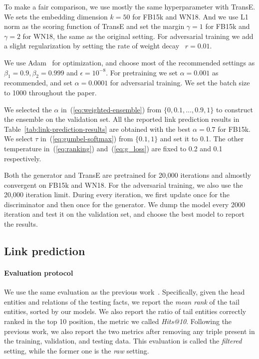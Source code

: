 \documentclass[twocolumn,a4paper,preprint,10pt,3p]{elsarticle}
\begin{document}
To make a fair comparison, we use mostly the same hyperparameter with TransE. We sets the embedding dimension $k=50$ for FB15k and WN18. And we use L1 norm as the scoring function of TransE and set the margin $\gamma=1$ for FB15k and $\gamma=2$ for WN18, the same as the original setting.
For adversarial training we add a slight regularization by setting the rate of weight decay~\cite{weight_decay} $r=0.01$.

We use Adam~\cite{Adam} for optimization, and choose most of the recommended settings as $\beta_1=0.9,\beta_2=0.999$ and $\epsilon=10^{-8}$. For pretraining we set $\alpha=0.001$ as recommended, and set $\alpha=0.0001$ for adversarial training. We set the batch size to 1000 throughout the paper.

We selected the $\alpha$ in~(\ref{eq:weighted-ensemble}) from $ \{0, 0.1, \dots, 0.9, 1\} $ to construct the ensemble on the validation set. All the reported link prediction results in Table~\ref{tab:link-prediction-results} are obtained with the best $\alpha=0.7$ for FB15k. We select $\tau$ in~(\ref{eq:gumbel-softmax}) from $\{ 0.1, 1\}$ and set it to 0.1. The other temperature in~(\ref{eq:ranking}) and~(\ref{eq:g_loss}) are fixed to 0.2 and 0.1 respectively.

Both the generator and TransE are pretrained for 20,000 iterations and almostly convergent on FB15k and WN18. For the adversarial training, we also use the 20,000 iteration limit. During every iteration, we first update once for the discriminator and then once for the generator. We dump the model every 2000 iteration and test it on the validation set, and choose the best model to report the results.

\subsection{Link prediction}

\paragraph{Evaluation protocol} We use the same evaluation as the previous work~\cite{TransE2013,TransR2015,TransG,TransD}. Specifically, given the head entities and relations of the testing facts, we report the \emph{mean rank} of the tail entities, sorted by our models. We also report the ratio of tail entities correctly ranked in the top 10 position, the metric we called \emph{Hits@10}. Following the previous work, we also report the two metrics after removing any triple present in the training, validation, and testing data. This evaluation is called the \emph{filtered} setting, while the former one is the \emph{raw} setting.
\end{document}
